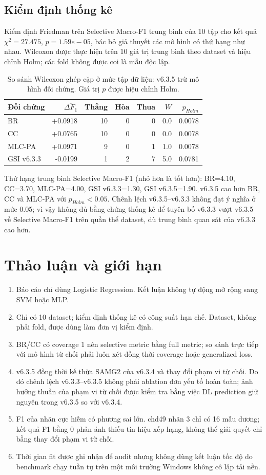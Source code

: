\documentclass[11pt,a4paper,twoside]{article}
\begin{document}
\subsection{Kiểm định thống kê}
Kiểm định Friedman trên Selective Macro-F1 trung bình của 10 tập cho kết quả $\chi^2=27.475$, $p=1.59e-05$, bác bỏ giả thuyết các mô hình có thứ hạng như nhau. Wilcoxon được thực hiện trên 10 giá trị trung bình theo dataset và hiệu chỉnh Holm; các fold không được coi là mẫu độc lập.
\begin{table}[H]
\centering
\caption{So sánh Wilcoxon ghép cặp ở mức tập dữ liệu: v6.3.5 trừ mô hình đối chứng. Giá trị $p$ được hiệu chỉnh Holm.}
\label{tab:wilcoxon}
\small
\begin{tabular}{lrrrrrr}
\toprule
Đối chứng & $\overline{\Delta F_1}$ & Thắng & Hòa & Thua & $W$ & $p_{Holm}$ \\
\midrule
BR & +0.0918 & 10 & 0 & 0 & 0.0 & 0.0078 \\
CC & +0.0765 & 10 & 0 & 0 & 0.0 & 0.0078 \\
MLC-PA & +0.0971 & 9 & 0 & 1 & 1.0 & 0.0078 \\
GSI v6.3.3 & -0.0199 & 1 & 2 & 7 & 5.0 & 0.0781 \\
\bottomrule
\end{tabular}
\end{table}
\noindent Thứ hạng trung bình Selective Macro-F1 (nhỏ hơn là tốt hơn): BR=4.10, CC=3.70, MLC-PA=4.00, GSI v6.3.3=1.30, GSI v6.3.5=1.90.
v6.3.5 cao hơn BR, CC và MLC-PA với $p_{Holm}<0.05$. Chênh lệch v6.3.5--v6.3.3 không đạt ý nghĩa ở mức 0.05; vì vậy không đủ bằng chứng thống kê để tuyên bố v6.3.3 vượt v6.3.5 về Selective Macro-F1 trên quần thể dataset, dù trung bình quan sát của v6.3.3 cao hơn.
\section{Thảo luận và giới hạn}
\begin{enumerate}
\item Báo cáo chỉ dùng Logistic Regression. Kết luận không tự động mở rộng sang SVM hoặc MLP.
\item Chỉ có 10 dataset; kiểm định thống kê có công suất hạn chế. Dataset, không phải fold, được dùng làm đơn vị kiểm định.
\item BR/CC có coverage 1 nên selective metric bằng full metric; so sánh trực tiếp với mô hình từ chối phải luôn xét đồng thời coverage hoặc generalized loss.
\item v6.3.5 đồng thời kế thừa SAMG2 của v6.3.4 và thay đổi phạm vi từ chối. Do đó chênh lệch v6.3.3--v6.3.5 không phải ablation đơn yếu tố hoàn toàn; ảnh hưởng thuần của phạm vi từ chối được kiểm tra bằng việc DL prediction giữ nguyên trong v6.3.5 so với v6.3.4.
\item F1 của nhãn cực hiếm có phương sai lớn. chd49 nhãn 3 chỉ có 16 mẫu dương; kết quả F1 bằng 0 phản ánh thiếu tín hiệu xếp hạng, không thể giải quyết chỉ bằng thay đổi phạm vi từ chối.
\item Thời gian fit được ghi nhận để audit nhưng không dùng kết luận tốc độ do benchmark chạy tuần tự trên một môi trường Windows không cô lập tải nền.
\end{enumerate}
\end{document}
